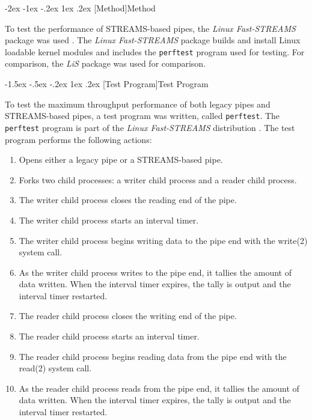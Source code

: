 \documentclass[letterpaper,final,notitlepage,twocolumn,10pt,twoside]{article}
\makeatletter
\let\large = \normalsize
\let\normalsize = \small
\let\small = \footnotesize
\let\footnotesize = \scriptsize
\let\scriptsize = \tiny
\renewcommand\section{\@startsection {section}{1}{\z@}%
                                   {-2ex \@plus -1ex \@minus -.2ex}%
                                   {1ex \@plus .2ex}%
                                   {\normalfont\large\bfseries}}
\renewcommand\subsection{\@startsection{subsection}{2}{\z@}%
                                     {-1.5ex \@plus -.5ex \@minus -.2ex}%
                                     {1ex \@plus .2ex}%
                                     {\normalfont\normalsize\bfseries}}
\makeatother
\begin{document}
\section[Method]{Method}

To test the performance of STREAMS-based pipes, the \textsl{Linux Fast-STREAMS} package was used
\cite[]{LfS}.  The \textsl{Linux Fast-STREAMS} package builds and install Linux loadable kernel
modules and includes the
\texttt{perftest} program used for testing.  For comparison, the \textsl{LiS} package \cite[]{LiS}
was used for comparison.

\subsection[Test Program]{Test Program}

To test the maximum throughput performance of both legacy pipes and STREAMS-based pipes, a test
program was written, called \texttt{perftest}.  The \texttt{perftest} program is part of the
\textsl{Linux Fast-STREAMS} distribution \cite[]{LfS}.  The test program performs the following
actions:

\begin{enumerate}

\item Opens either a legacy pipe or a STREAMS-based pipe.

\item Forks two child processes: a writer child process and a reader child process.

\item The writer child process closes the reading end of the pipe.

\item The writer child process starts an interval timer.

\item The writer child process begins writing data to the pipe end with the write(2) system call.

\item As the writer child process writes to the pipe end, it tallies the amount of data written.
When the interval timer expires, the tally is output and the interval timer restarted.

\item The reader child process closes the writing end of the pipe.

\item The reader child process starts an interval timer.

\item The reader child process begins reading data from the pipe end with the read(2) system call.

\item As the reader child process reads from the pipe end, it tallies the amount of data written.
When the interval timer expires, the tally is output and the interval timer restarted.

\end{enumerate}
\end{document}
